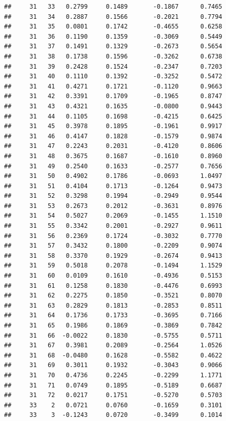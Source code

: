 \documentclass[
]{article}
\begin{document}
\begin{verbatim}
##     31   33   0.2799     0.1489       -0.1867      0.7465  
##     31   34   0.2887     0.1566       -0.2021      0.7794  
##     31   35   0.0801     0.1742       -0.4655      0.6258  
##     31   36   0.1190     0.1359       -0.3069      0.5449  
##     31   37   0.1491     0.1329       -0.2673      0.5654  
##     31   38   0.1738     0.1596       -0.3262      0.6738  
##     31   39   0.2428     0.1524       -0.2347      0.7203  
##     31   40   0.1110     0.1392       -0.3252      0.5472  
##     31   41   0.4271     0.1721       -0.1120      0.9663  
##     31   42   0.3391     0.1709       -0.1965      0.8747  
##     31   43   0.4321     0.1635       -0.0800      0.9443  
##     31   44   0.1105     0.1698       -0.4215      0.6425  
##     31   45   0.3978     0.1895       -0.1961      0.9917  
##     31   46   0.4147     0.1828       -0.1579      0.9874  
##     31   47   0.2243     0.2031       -0.4120      0.8606  
##     31   48   0.3675     0.1687       -0.1610      0.8960  
##     31   49   0.2540     0.1633       -0.2577      0.7656  
##     31   50   0.4902     0.1786       -0.0693      1.0497  
##     31   51   0.4104     0.1713       -0.1264      0.9473  
##     31   52   0.3298     0.1994       -0.2949      0.9544  
##     31   53   0.2673     0.2012       -0.3631      0.8976  
##     31   54   0.5027     0.2069       -0.1455      1.1510  
##     31   55   0.3342     0.2001       -0.2927      0.9611  
##     31   56   0.2369     0.1724       -0.3032      0.7770  
##     31   57   0.3432     0.1800       -0.2209      0.9074  
##     31   58   0.3370     0.1929       -0.2674      0.9413  
##     31   59   0.5018     0.2078       -0.1494      1.1529  
##     31   60   0.0109     0.1610       -0.4936      0.5153  
##     31   61   0.1258     0.1830       -0.4476      0.6993  
##     31   62   0.2275     0.1850       -0.3521      0.8070  
##     31   63   0.2829     0.1813       -0.2853      0.8511  
##     31   64   0.1736     0.1733       -0.3695      0.7166  
##     31   65   0.1986     0.1869       -0.3869      0.7842  
##     31   66  -0.0022     0.1830       -0.5755      0.5711  
##     31   67   0.3981     0.2089       -0.2564      1.0526  
##     31   68  -0.0480     0.1628       -0.5582      0.4622  
##     31   69   0.3011     0.1932       -0.3043      0.9066  
##     31   70   0.4736     0.2245       -0.2299      1.1771  
##     31   71   0.0749     0.1895       -0.5189      0.6687  
##     31   72   0.0217     0.1751       -0.5270      0.5703  
##     33    2   0.0721     0.0760       -0.1659      0.3101  
##     33    3  -0.1243     0.0720       -0.3499      0.1014  

\end{verbatim}
\end{document}
